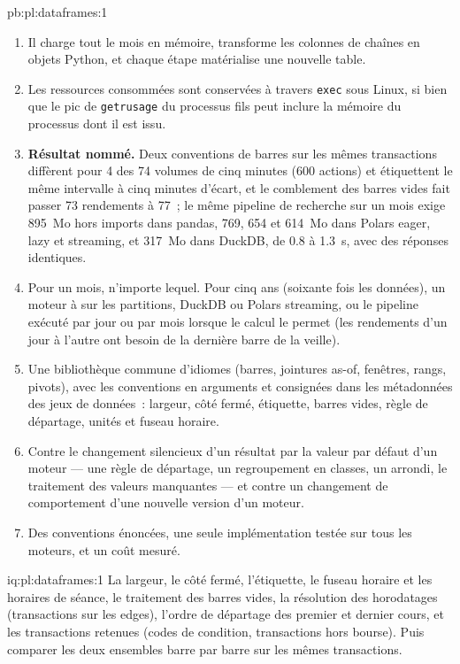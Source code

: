 \begin{solution}{pb:pl:dataframes:1}
\begin{enumerate}
\item Il charge tout le mois en mémoire, transforme les colonnes de chaînes en objets Python, et chaque étape matérialise une nouvelle table.
\item Les ressources consommées sont conservées à travers \texttt{exec} sous Linux, si bien que le pic de \texttt{getrusage} du processus fils peut inclure la mémoire du processus
dont il est issu.
\item \textbf{Résultat nommé.} Deux conventions de barres sur les mêmes transactions diffèrent pour 4 des 74 volumes de cinq minutes (600 actions) et étiquettent le même
intervalle à cinq minutes d'écart, et le comblement des barres vides fait passer 73 rendements à 77~; le même pipeline de recherche sur un mois exige 895~Mo
hors imports dans pandas, 769, 654 et 614~Mo dans Polars eager, lazy et streaming, et 317~Mo dans DuckDB, de 0.8 à 1.3~s, avec
des réponses identiques.
\item Pour un mois, n'importe lequel. Pour cinq ans (soixante fois les données), un moteur à  sur les partitions, DuckDB ou Polars streaming, ou le
pipeline exécuté par jour ou par mois lorsque le calcul le permet (les rendements d'un jour à l'autre ont besoin de la dernière barre de la veille).
\item Une bibliothèque commune d'idiomes (barres, jointures as-of, fenêtres, rangs, pivots), avec les conventions en arguments et consignées dans les
métadonnées des jeux de données~: largeur, côté fermé, étiquette, barres vides, règle de départage, unités et fuseau horaire.
\item Contre le changement silencieux d'un résultat par la valeur par défaut d'un moteur --- une règle de départage, un regroupement en classes, un arrondi, le traitement des valeurs manquantes ---
et contre un changement de comportement d'une nouvelle version d'un moteur.
\item Des conventions énoncées, une seule implémentation testée sur tous les moteurs, et un coût mesuré.
\end{enumerate}
\end{solution}

\begin{solution}{iq:pl:dataframes:1}
La largeur, le côté fermé, l'étiquette, le fuseau horaire et les horaires de séance, le traitement des barres vides, la résolution des horodatages (transactions sur les
edges), l'ordre de départage des premier et dernier cours, et les transactions retenues (codes de condition, transactions hors bourse). Puis comparer les deux
ensembles barre par barre sur les mêmes transactions.
\end{solution}

